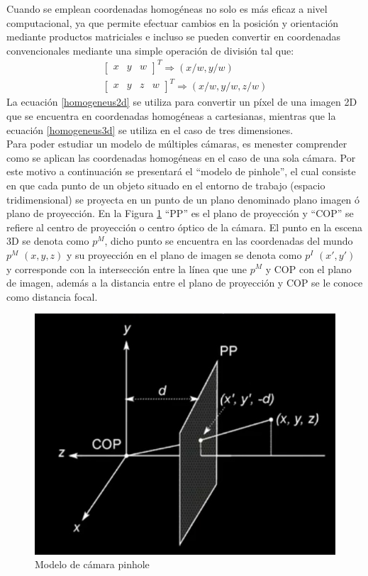 Cuando se emplean coordenadas homogéneas no solo es más eficaz a nivel computacional, ya que permite efectuar cambios en la posición y orientación mediante productos matriciales e incluso se pueden convertir en coordenadas convencionales mediante una simple operación de división tal que:
\begin{align}
\begin{bmatrix}
x & y & w
\end{bmatrix}^{T} \Rightarrow (x/w, y/w)\label{homogeneus2d}\\
\begin{bmatrix}
x & y & z & w
\end{bmatrix}^{T} \Rightarrow (x/w, y/w, z/w)\label{homogeneus3d}
\end{align}
La ecuación \ref{homogeneus2d} se utiliza para convertir un píxel de una imagen 2D que se encuentra en coordenadas homogéneas a cartesianas, mientras que la ecuación \ref{homogeneus3d} se utiliza en el caso de tres dimensiones.
\\
Para poder estudiar un modelo de múltiples cámaras, es menester comprender como se aplican las coordenadas homogéneas en el caso de una sola cámara. Por este motivo a continuación se presentará el ``modelo de pinhole'', el cual consiste en que cada punto de un objeto situado en el entorno de trabajo (espacio tridimensional) se proyecta en un punto de un plano denominado plano imagen ó plano de proyección. En la Figura \ref{pinholeModel} ``PP'' es el plano de proyección y ``COP'' se refiere al centro de proyección o centro óptico de la cámara. El punto en la escena 3D se denota como $p^{M}$, dicho punto se encuentra en las coordenadas del mundo $p^{M}$ $(x, y, z)$ y su proyección en el plano de imagen se denota como $p^{I}$ $(x', y')$ y corresponde con la intersección entre la línea que une $p^{M}$ y COP con el plano de imagen, además a la distancia entre el plano de proyección y COP se le conoce como distancia focal. 
\begin{figure}[H]
    \centering
    \includegraphics[scale=0.5]{Recursos/pinholeModel.jpg}
    \caption{Modelo de cámara pinhole}
    \label{pinholeModel}
\end{figure}
